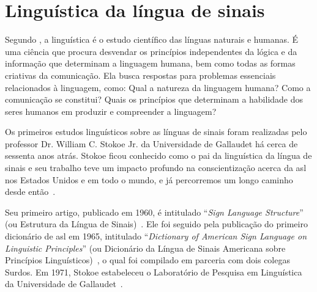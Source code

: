 \section{Linguística da língua de sinais}
\label{linguistica-lingua-sinais}

Segundo \citeauthor{quadros-2004-estudos-linguisticos}, a linguística é o estudo científico das línguas naturais e humanas. É uma ciência que procura desvendar os princípios independentes da lógica e da informação que determinam a linguagem humana, bem como todas as formas criativas da comunicação.
Ela busca respostas para problemas essenciais relacionados à linguagem, como: Qual a natureza da linguagem humana? Como a comunicação se constitui? Quais os princípios que determinam a habilidade dos seres humanos em produzir e compreender a linguagem?~\cite{quadros-2004-estudos-linguisticos}


% 


Os primeiros estudos linguísticos sobre as línguas de sinais foram realizadas pelo professor Dr. William C. Stokoe Jr. da Universidade de Gallaudet há cerca de sessenta anos atrás. Stokoe ficou conhecido como o pai da linguística da língua de sinais e seu trabalho teve um impacto profundo na conscientização acerca da \acrshort{asl} nos Estados Unidos e em todo o mundo, e já percorremos um longo caminho desde então~\cite{stewart-2021-barrons-asl}.

Seu primeiro artigo, publicado em 1960, é intitulado ``\textit{Sign Language Structure}'' (ou Estrutura da Língua de Sinais)~\cite{stokoe-1960-sl-structure}. Ele foi seguido pela publicação do primeiro dicionário de \acrshort{asl} em 1965, intitulado ``\textit{Dictionary of American Sign Language on Linguistic Principles}'' (ou Dicionário da Língua de Sinais Americana sobre Princípios Linguísticos)~\cite{stokoe-1965-dictionary-asl}, o qual foi compilado em parceria com dois colegas Surdos. Em 1971, Stokoe estabeleceu o Laboratório de Pesquisa em Linguística da Universidade de Gallaudet~\cite{stewart-2021-barrons-asl}.



